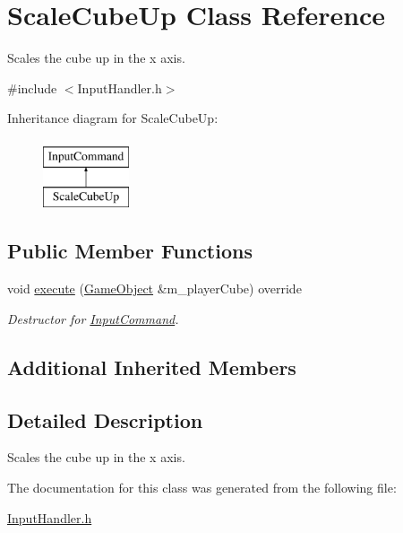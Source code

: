 \hypertarget{class_scale_cube_up}{}\section{Scale\+Cube\+Up Class Reference}
\label{class_scale_cube_up}


Scales the cube up in the x axis.  




{\ttfamily \#include $<$Input\+Handler.\+h$>$}

Inheritance diagram for Scale\+Cube\+Up\+:\begin{figure}[H]
\begin{center}
\leavevmode
\includegraphics[height=2.000000cm]{class_scale_cube_up}
\end{center}
\end{figure}
\subsection*{Public Member Functions}
\begin{DoxyCompactItemize}
\item 
\mbox{\label{class_scale_cube_up_aa8c49c993eb1db96281e6b5832bed6a5}} 
void \mbox{\hyperlink{class_scale_cube_up_aa8c49c993eb1db96281e6b5832bed6a5}{execute}} (\mbox{\hyperlink{class_game_object}{Game\+Object}} \&m\+\_\+player\+Cube) override
\begin{DoxyCompactList}\small\item\em Destructor for \mbox{\hyperlink{class_input_command}{Input\+Command}}. \end{DoxyCompactList}\end{DoxyCompactItemize}
\subsection*{Additional Inherited Members}


\subsection{Detailed Description}
Scales the cube up in the x axis. 

The documentation for this class was generated from the following file\+:\begin{DoxyCompactItemize}
\item 
\mbox{\hyperlink{_input_handler_8h}{Input\+Handler.\+h}}\end{DoxyCompactItemize}
